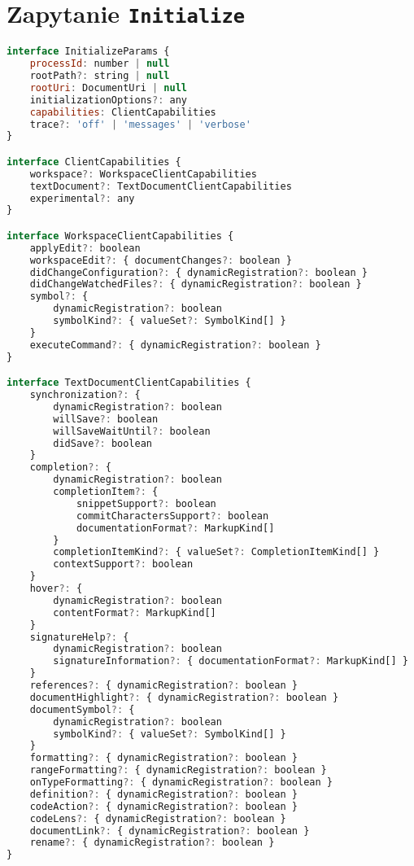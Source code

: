 \section{Zapytanie \texttt{Initialize}}
\begin{lstlisting}[language=JavaScript, basicstyle=\fontsize{9}{10}\ttfamily]
interface InitializeParams {
    processId: number | null
    rootPath?: string | null
    rootUri: DocumentUri | null
    initializationOptions?: any
    capabilities: ClientCapabilities
    trace?: 'off' | 'messages' | 'verbose'
}

interface ClientCapabilities {
    workspace?: WorkspaceClientCapabilities
    textDocument?: TextDocumentClientCapabilities
    experimental?: any
}

interface WorkspaceClientCapabilities {
    applyEdit?: boolean
    workspaceEdit?: { documentChanges?: boolean }
    didChangeConfiguration?: { dynamicRegistration?: boolean }
    didChangeWatchedFiles?: { dynamicRegistration?: boolean }
    symbol?: {
        dynamicRegistration?: boolean
        symbolKind?: { valueSet?: SymbolKind[] }
    }
    executeCommand?: { dynamicRegistration?: boolean }
}

interface TextDocumentClientCapabilities {
    synchronization?: {
        dynamicRegistration?: boolean
        willSave?: boolean
        willSaveWaitUntil?: boolean
        didSave?: boolean
    }
    completion?: {
        dynamicRegistration?: boolean
        completionItem?: {
            snippetSupport?: boolean
            commitCharactersSupport?: boolean
            documentationFormat?: MarkupKind[]
        }
        completionItemKind?: { valueSet?: CompletionItemKind[] }
        contextSupport?: boolean		
    }
    hover?: {
        dynamicRegistration?: boolean
        contentFormat?: MarkupKind[]
    }
    signatureHelp?: {
        dynamicRegistration?: boolean
        signatureInformation?: { documentationFormat?: MarkupKind[] }
    }
    references?: { dynamicRegistration?: boolean }
    documentHighlight?: { dynamicRegistration?: boolean }
    documentSymbol?: {
        dynamicRegistration?: boolean
        symbolKind?: { valueSet?: SymbolKind[] }
    }
    formatting?: { dynamicRegistration?: boolean }
    rangeFormatting?: { dynamicRegistration?: boolean }
    onTypeFormatting?: { dynamicRegistration?: boolean }
    definition?: { dynamicRegistration?: boolean }
    codeAction?: { dynamicRegistration?: boolean }
    codeLens?: { dynamicRegistration?: boolean }
    documentLink?: { dynamicRegistration?: boolean }
	rename?: { dynamicRegistration?: boolean }
}
\end{lstlisting}

